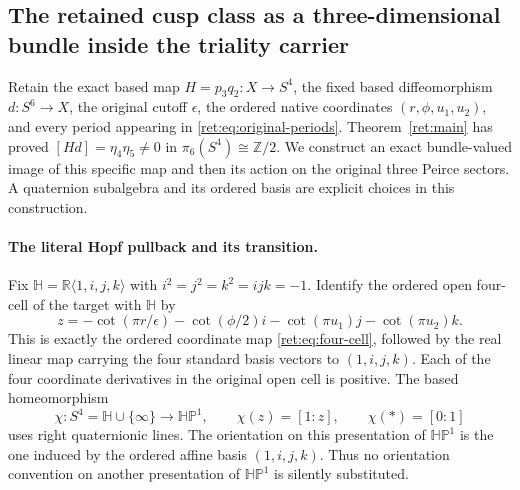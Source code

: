 \documentclass[11pt]{article}
\theoremstyle{definition}
\begin{document}

\subsection{The retained cusp class as a three-dimensional bundle inside the triality carrier}
\label{rettri:section}

Retain the exact based map $H=p_3q_2:X\to S^4$, the fixed based
diffeomorphism $d:S^6\to X$, the original cutoff $\epsilon$, the ordered
native coordinates $(r,\phi,u_1,u_2)$, and every period appearing in
\eqref{ret:eq:original-periods}. Theorem~\ref{ret:main} has proved
$[H d]=\eta_4\eta_5\ne0$ in $\pi_6(S^4)\cong\mathbb Z/2$.
We construct an exact bundle-valued image of this specific map and then
its action on the original three Peirce sectors. A quaternion subalgebra
and its ordered basis are explicit choices in this construction.

\paragraph{The literal Hopf pullback and its transition.}
Fix $\mathbb H=\mathbb R\langle1,i,j,k\rangle$ with
$i^2=j^2=k^2=ijk=-1$. Identify the ordered open four-cell of the target
with $\mathbb H$ by
\begin{equation}
 z=-\cot(\pi r/\epsilon)-\cot(\phi/2)i
       -\cot(\pi u_1)j-\cot(\pi u_2)k.
 \label{rettri:z}
\end{equation}
This is exactly the ordered coordinate map
\eqref{ret:eq:four-cell}, followed by the real linear map carrying
the four standard basis vectors to $(1,i,j,k)$. Each of the four
coordinate derivatives in the original open cell is positive.
The based homeomorphism
\begin{equation}
 \chi:S^4=\mathbb H\cup\{\infty\}\longrightarrow\mathbb H\mathbb P^1,
 \qquad \chi(z)=[1:z],\qquad \chi(*)=[0:1]
 \label{rettri:chi}
\end{equation}
uses right quaternionic lines. The orientation on this presentation of
$\mathbb H\mathbb P^1$ is the one induced by the ordered affine basis
$(1,i,j,k)$. Thus no orientation convention on another presentation of
$\mathbb H\mathbb P^1$ is silently substituted.
\end{document}
